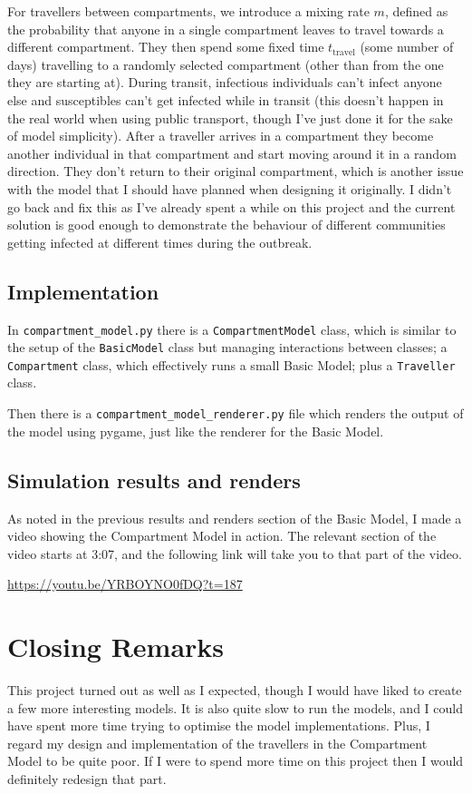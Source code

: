 \documentclass[11pt]{article}
\begin{document}
For travellers between compartments, we introduce a mixing rate $m$, defined as the probability that anyone in a single compartment leaves to travel towards a different compartment. They then spend some fixed time $t_{\text{travel}}$ (some number of days) travelling to a randomly selected compartment (other than from the one they are starting at). During transit, infectious individuals can't infect anyone else and susceptibles can't get infected while in transit (this doesn't happen in the real world when using public transport, though I've just done it for the sake of model simplicity). After a traveller arrives in a compartment they become another individual in that compartment and start moving around it in a random direction. They don't return to their original compartment, which is another issue with the model that I should have planned when designing it originally. I didn't go back and fix this as I've already spent a while on this project and the current solution is good enough to demonstrate the behaviour of different communities getting infected at different times during the outbreak.

\subsection{Implementation}
In \texttt{compartment\_model.py} there is a \texttt{CompartmentModel} class, which is similar to the setup of the \texttt{BasicModel} class but managing interactions between classes; a \texttt{Compartment} class, which effectively runs a small Basic Model; plus a \texttt{Traveller} class.

Then there is a \texttt{compartment\_model\_renderer.py} file which renders the output of the model using pygame, just like the renderer for the Basic Model.

\subsection{Simulation results and renders}
As noted in the previous results and renders section of the Basic Model, I made a video showing the Compartment Model in action. The relevant section of the video starts at 3:07, and the following link will take you to that part of the video.

\vspace{4px}
\url{https://youtu.be/YRBOYNO0fDQ?t=187}
\section{Closing Remarks}
This project turned out as well as I expected, though I would have liked to create a few more interesting models. It is also quite slow to run the models, and I could have spent more time trying to optimise the model implementations. Plus, I regard my design and implementation of the travellers in the Compartment Model to be quite poor. If I were to spend more time on this project then I would definitely redesign that part.
\end{document}
